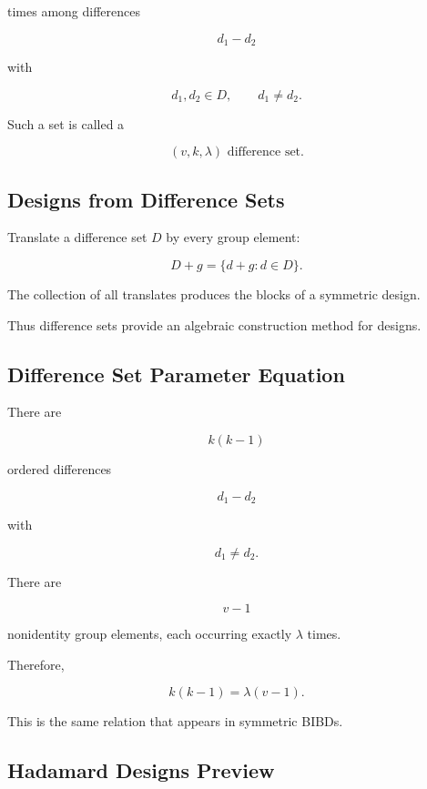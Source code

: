 times among differences

\[
d_1-d_2
\]

with

\[
d_1,d_2\in D,
\qquad
d_1\neq d_2.
\]

Such a set is called a

\[
\boxed{
(v,k,\lambda)\text{ difference set}.
}
\]

\subsection{Designs from Difference Sets}
\label{subsec:designs-from-difference-sets}

Translate a difference set \(D\) by every group element:

\[
D+g
=
\{d+g:d\in D\}.
\]

The collection of all translates produces the blocks of a symmetric
design.

Thus difference sets provide an algebraic construction method for
designs.

\subsection{Difference Set Parameter Equation}
\label{subsec:difference-set-equation}

There are

\[
k(k-1)
\]

ordered differences

\[
d_1-d_2
\]

with

\[
d_1\neq d_2.
\]

There are

\[
v-1
\]

nonidentity group elements, each occurring exactly \(\lambda\) times.

Therefore,

\[
\boxed{
k(k-1)
=
\lambda(v-1).
}
\]

This is the same relation that appears in symmetric BIBDs.

\subsection{Hadamard Designs Preview}
\label{subsec:hadamard-designs-preview}

